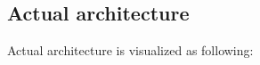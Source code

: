 \documentclass{article}
\begin{document}
\subsection{Actual architecture}
Actual architecture is visualized as following:
\begin{figure}[h]
\end{figure}
\end{document}
